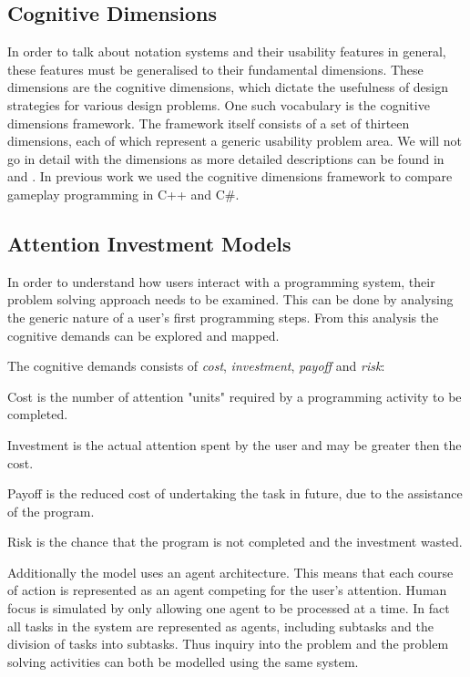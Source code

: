 \subsection{Cognitive Dimensions} \label{sec:cog-dim}
In order to talk about notation systems and their usability features in general, these features must be generalised to their fundamental dimensions. These dimensions are the cognitive dimensions, which dictate the usefulness of design strategies for various design problems. One such vocabulary is the cognitive dimensions framework\cite{green1996usability}. The framework itself consists of a set of thirteen dimensions, each of which represent a generic usability problem area. We will not go in detail with the dimensions as more detailed descriptions can be found in \cite{green1996usability} and \cite{p92018gameplay}. In previous work we used the cognitive dimensions framework to compare gameplay programming in C++ and C\#\cite{p92018gameplay}.

\subsection{Attention Investment Models} \label{sec:attention-investment}
In order to understand how users interact with a programming system, their problem solving approach needs to be examined. This can be done by analysing the generic nature of a user's first programming steps. From this analysis the cognitive demands can be explored and mapped\cite{blackwell2002first}.

The cognitive demands consists of \textit{cost}, \textit{investment}, \textit{payoff} and \textit{risk}:
\begin{labeling}{\quad\quad}
    \item[Cost] is the number of attention "units" required by a programming activity to be completed.
    \item[Investment] is the actual attention spent by the user and may be greater then the cost.
    \item[Payoff] is the reduced cost of undertaking the task in future, due to the assistance of the program.
    \item[Risk] is the chance that the program is not completed and the investment wasted.
\end{labeling}

Additionally the model uses an agent architecture. This means that each course of action is represented as an agent competing for the user's attention. Human focus is simulated by only allowing one agent to be processed at a time. In fact all tasks in the system are represented as agents, including subtasks and the division of tasks into subtasks. Thus inquiry into the problem and the problem solving activities can both be modelled using the same system.

